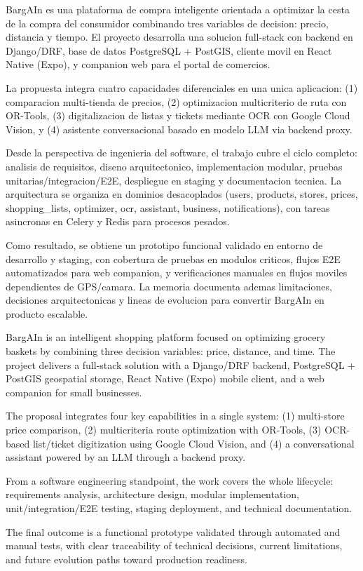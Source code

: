 
BargAIn es una plataforma de compra inteligente orientada a optimizar la cesta de la compra
del consumidor combinando tres variables de decision: precio, distancia y tiempo.
El proyecto desarrolla una solucion full-stack con backend en Django/DRF,
base de datos PostgreSQL + PostGIS, cliente movil en React Native (Expo),
y companion web para el portal de comercios.

La propuesta integra cuatro capacidades diferenciales en una unica aplicacion:
(1) comparacion multi-tienda de precios,
(2) optimizacion multicriterio de ruta con OR-Tools,
(3) digitalizacion de listas y tickets mediante OCR con Google Cloud Vision,
y (4) asistente conversacional basado en modelo LLM via backend proxy.

Desde la perspectiva de ingenieria del software, el trabajo cubre el ciclo completo:
analisis de requisitos, diseno arquitectonico, implementacion modular,
pruebas unitarias/integracion/E2E, despliegue en staging y documentacion tecnica.
La arquitectura se organiza en dominios desacoplados
(users, products, stores, prices, shopping\_lists, optimizer, ocr, assistant, business,
notifications), con tareas asincronas en Celery y Redis para procesos pesados.

Como resultado, se obtiene un prototipo funcional validado en entorno de desarrollo y staging,
con cobertura de pruebas en modulos criticos, flujos E2E automatizados para web companion,
y verificaciones manuales en flujos moviles dependientes de GPS/camara.
La memoria documenta ademas limitaciones, decisiones arquitectonicas y lineas de evolucion
para convertir BargAIn en producto escalable.


BargAIn is an intelligent shopping platform focused on optimizing grocery baskets by combining
three decision variables: price, distance, and time. The project delivers a full-stack solution
with a Django/DRF backend, PostgreSQL + PostGIS geospatial storage,
React Native (Expo) mobile client, and a web companion for small businesses.

The proposal integrates four key capabilities in a single system:
(1) multi-store price comparison,
(2) multicriteria route optimization with OR-Tools,
(3) OCR-based list/ticket digitization using Google Cloud Vision,
and (4) a conversational assistant powered by an LLM through a backend proxy.

From a software engineering standpoint, the work covers the whole lifecycle:
requirements analysis, architecture design, modular implementation,
unit/integration/E2E testing, staging deployment, and technical documentation.

The final outcome is a functional prototype validated through automated and manual tests,
with clear traceability of technical decisions, current limitations,
and future evolution paths toward production readiness.



